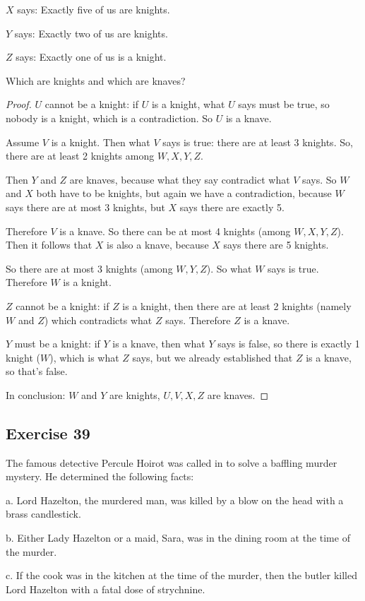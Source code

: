 \documentclass[14pt]{extarticle}
\begin{document}
$X$ says: Exactly five of us are knights.

$Y$ says: Exactly two of us are knights.

$Z$ says: Exactly one of us is a knight.

Which are knights and which are knaves?

\begin{proof} 
$U$ cannot be a knight: if $U$ is a knight, what $U$ says must be true, so nobody is a knight, which is a contradiction. So $U$ is a knave.

Assume $V$ is a knight. Then what $V$ says is true: there are at least 3 knights. So, there are at least 2 knights among $W, X, Y, Z$.

Then $Y$ and $Z$ are knaves, because what they say contradict what $V$ says. So $W$ and $X$ both have to be knights, but again we have a contradiction, because $W$ says there are at most 3 knights, but $X$ says there are exactly 5.

Therefore $V$ is a knave. So there can be at most 4 knights (among $W, X, Y, Z$). Then it follows that $X$ is also a knave, because $X$ says there are 5 knights.

So there are at most 3 knights (among $W, Y, Z$). So what $W$ says is true. Therefore $W$ is a knight.

$Z$ cannot be a knight: if $Z$ is a knight, then there are at least 2 knights (namely $W$ and $Z$) which contradicts what $Z$ says. Therefore $Z$ is a knave.

$Y$ must be a knight: if $Y$ is a knave, then what $Y$ says is false, so there is exactly 1 knight ($W$), which is what $Z$ says, but we already established that $Z$ is a knave, so that's false.

In conclusion: $W$ and $Y$ are knights, $U,V,X,Z$ are knaves. \end{proof}

\subsection{Exercise 39} 
The famous detective Percule Hoirot was called in to solve a baffling murder mystery. He determined the following facts:

a. Lord Hazelton, the murdered man, was killed by a blow on the head with a brass candlestick.

b. Either Lady Hazelton or a maid, Sara, was in the dining room at the time of the murder.

c. If the cook was in the kitchen at the time of the murder, then the butler killed Lord Hazelton with a fatal dose of strychnine.
\end{document}
